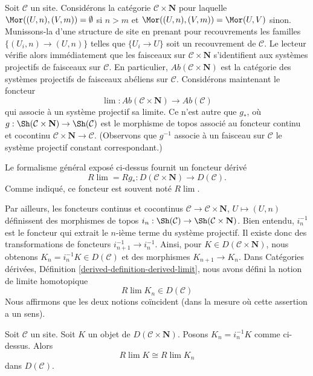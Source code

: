 \noindent
Soit $\mathcal{C}$ un site. Considérons la catégorie
$\mathcal{C} \times \mathbf{N}$ pour laquelle
$\Mor((U, n), (V, m)) = \emptyset$ si $n > m$ et
$\Mor((U, n), (V, m)) = \Mor(U, V)$ sinon. Munissons-la d'une structure
de site en prenant pour recouvrements les familles
$\{(U_i, n) \to (U, n)\}$ telles que $\{U_i \to U\}$ soit un recouvrement
de $\mathcal{C}$. Le lecteur vérifie alors immédiatement que les faisceaux
sur $\mathcal{C} \times \mathbf{N}$ s'identifient aux systèmes projectifs
de faisceaux sur $\mathcal{C}$. En particulier,
$\textit{Ab}(\mathcal{C} \times \mathbf{N})$ est la catégorie des systèmes
projectifs de faisceaux abéliens sur $\mathcal{C}$. Considérons maintenant
le foncteur
$$
\lim : \textit{Ab}(\mathcal{C} \times \mathbf{N}) \to \textit{Ab}(\mathcal{C})
$$
qui associe à un système projectif sa limite. Ce n'est autre que $g_*$, où
$g : \Sh(\mathcal{C} \times \mathbf{N}) \to \Sh(\mathcal{C})$ est le
morphisme de topos associé au foncteur continu et cocontinu
$\mathcal{C} \times \mathbf{N} \to \mathcal{C}$. (Observons que $g^{-1}$
associe à un faisceau sur $\mathcal{C}$ le système projectif constant
correspondant.)

\medskip\noindent
Le formalisme général exposé ci-dessus fournit un foncteur dérivé
$$
R\lim = Rg_* : D(\mathcal{C} \times \mathbf{N}) \to D(\mathcal{C}).
$$
Comme indiqué, ce foncteur est souvent noté $R\lim$.

\medskip\noindent
Par ailleurs, les foncteurs continus et cocontinus
$\mathcal{C} \to \mathcal{C} \times \mathbf{N}$,
$U \mapsto (U, n)$ définissent des morphismes de topos
$i_n : \Sh(\mathcal{C}) \to \Sh(\mathcal{C} \times \mathbf{N})$.
Bien entendu, $i_n^{-1}$ est le foncteur qui extrait le $n$-ième terme du
système projectif. Il existe donc des transformations de foncteurs
$i_{n + 1}^{-1} \to i_n^{-1}$. Ainsi, pour
$K \in D(\mathcal{C} \times \mathbf{N})$, nous obtenons
$K_n = i_n^{-1}K \in D(\mathcal{C})$ et des morphismes
$K_{n + 1} \to K_n$. Dans Catégories dérivées, Définition
\ref{derived-definition-derived-limit}, nous avons défini la notion de
limite homotopique
$$
R\lim K_n \in D(\mathcal{C})
$$
Nous affirmons que les deux notions coïncident (dans la mesure où cette
assertion a un sens).

\begin{lemma}
\label{lemma-derived-limit-is-ok}
Soit $\mathcal{C}$ un site. Soit $K$ un objet de
$D(\mathcal{C} \times \mathbf{N})$. Posons $K_n = i_n^{-1}K$ comme
ci-dessus. Alors
$$
R\lim K \cong R\lim K_n
$$
dans $D(\mathcal{C})$.
\end{lemma}

